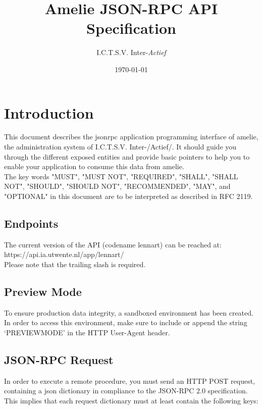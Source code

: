 \documentclass[a4paper]{scrreprt}
\title{Amelie JSON-RPC API Specification}
\author{I.C.T.S.V. Inter-\emph{Actief}}
\date{\today}
\begin{document}
\maketitle

\begin{versionhistory}
\end{versionhistory}

\tableofcontents


\chapter{Introduction}
This document describes the jsonrpc application programming interface of amelie, the administration system of I.C.T.S.V. Inter-/Actief/. It should guide you through the different exposed entities and provide basic pointers to help you to enable your application to consume this data from amelie. \\

The key words "MUST", "MUST NOT", "REQUIRED", "SHALL", "SHALL NOT", "SHOULD", "SHOULD NOT", "RECOMMENDED",  "MAY", and "OPTIONAL" in this document are to be interpreted as described in RFC 2119.

\section{Endpoints}
The current version of the API (codename lennart) can be reached at:\\
https://api.ia.utwente.nl/app/lennart/\\
Please note that the trailing slash is required.

\section{Preview Mode}
To ensure production data integrity, a sandboxed environment has been created. In order to access this environment, make sure to include or append the string `PREVIEWMODE' in the HTTP User-Agent header.

\section{JSON-RPC Request}
In order to execute a remote procedure, you must send an HTTP POST request, containing a json dictionary in compliance to the JSON-RPC 2.0 specification\cite{jsonrpc}. This implies that each request dictionary must at least contain the following keys:
\end{document}
